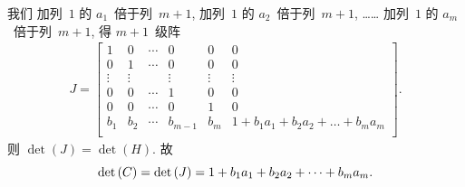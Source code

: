 \documentclass[../libro.tex]{subfiles}
\begin{document}
\begin{example}
    我们%
    加列~\(1\) 的 \(a_1\)~倍于列~\(m+1\),
    加列~\(1\) 的 \(a_2\)~倍于列~\(m+1\),
    ……
    加列~\(1\) 的 \(a_m\)~倍于列~\(m+1\),
    得 \(m+1\)~级阵
    \begin{align*}
        J =
        \begin{bmatrix}
            1      & 0      & \cdots & 0       & 0      & 0                                       \\
            0      & 1      & \cdots & 0       & 0      & 0                                       \\
            \vdots & \vdots & {}     & \vdots  & \vdots & \vdots                                  \\
            0      & 0      & \cdots & 1       & 0      & 0                                       \\
            0      & 0      & \cdots & 0       & 1      & 0                                       \\
            b_1    & b_2    & \cdots & b_{m-1} & b_m    & 1 + b_1 a_1 + b_2 a_2 + \dots + b_m a_m \\
        \end{bmatrix}.
    \end{align*}
    则 \(\det {(J)} = \det {(H)}\).
    故
    \begin{equation*}
        \det {(C)}
        = \det {(J)}
        = 1 + b_1 a_1 + b_2 a_2 + \dots + b_m a_m.
        \qedhere
    \end{equation*}
\end{example}



\end{document}

